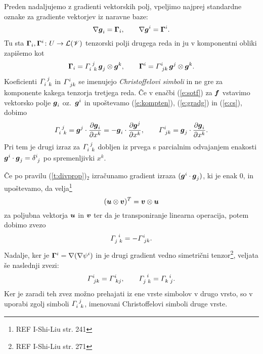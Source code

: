 Preden nadaljujemo z gradienti vektorskih polj, vpeljimo najprej standardne oznake
za gradiente vektorjev iz naravne baze:
\begin{equation} \label{e:gradg}
	\nabla\boldsymbol g_i=\mathbf \Gamma_i,\qquad\nabla\boldsymbol g^i=\mathbf \Gamma^i.
\end{equation}
Tu sta $\mathbf \Gamma_i,\mathbf \Gamma^i\colon U\to\mathcal L(\mathscr V)$ tenzorski polji drugega reda in ju
v komponentni obliki zapišemo kot
\begin{equation} \label{e:cs}
	\ten{\Gamma}_i=\cs{i}{j}{k}\,\vek{g}_j\otimes\vek{g}^k,\qquad\ten{\Gamma}^i=\ks{i}{jk}\,\vek{g}^j\otimes\vek{g}^k.
\end{equation}
Koeficienti $\cs{i}{j}{k}$ in $\ks{i}{jk}$ se imenujejo \emph{Christoffelovi simboli}
in ne gre za komponente kakega tenzorja tretjega reda. Če v enačbi (\ref{e:sotf})
za $\boldsymbol f$ vstavimo vektorsko polje $\boldsymbol g_i$ oz.~$\boldsymbol g^i$ in upoštevamo
(\ref{e:kompten}), (\ref{e:gradg}) in (\ref{e:cs}), dobimo
\begin{equation} \label{e:csexplicit}
	\cs{i}{j}{k}=\vek{g}^j\cdot\frac{\partial\vek{g}_i}{\partial x^k}
	=-\vek{g}_i\cdot\frac{\partial\vek{g}^j}{\partial x^k},\qquad
	\ks{i}{jk}=\vek{g}_j\cdot\frac{\partial\vek{g}_i}{\partial x^k}.
\end{equation}
Pri tem je drugi izraz za $\cs{i}{j}{k}$ dobljen iz prvega s parcialnim odvajanjem
enakosti $\vek{g}^i\cdot\vek{g}_j=\topbot{\delta}{i}{j}$ po spremenljivki $x^k$.

Če po pravilu (\ref{t:divprop})$_2$ izračunamo gradient izraza $(\boldsymbol g^i\cdot\boldsymbol g_j)$,
ki je enak 0, in upoštevamo, da velja\footnote{REF I-Shi-Liu str. 241}
\[(\boldsymbol u\otimes\boldsymbol v)^{T}=\boldsymbol v\otimes\boldsymbol u\]
za poljubna vektorja $\boldsymbol u$ in $\boldsymbol v$ ter da je transponiranje linearna operacija,
potem dobimo zvezo
\begin{equation} \label{e:lcs1}
	\cs{j}{i}{k}=-\ks{i}{jk}.
\end{equation}
Nadalje, ker je $\mathbf \Gamma^i=\nabla(\nabla\psi^i)$ in je drugi gradient vedno
simetrični tenzor\footnote{REF I-Shi-Liu str. 271}, veljata še naslednji zvezi:
\[ \ks{i}{jk}=\ks{i}{kj},\qquad\cs{j}{i}{k}=\cs{k}{i}{j}. \]
Ker je zaradi teh zvez možno prehajati iz ene vrste simbolov v drugo vrsto,
so v uporabi zgolj simboli $\cs{i}{j}{k}$, imenovani Christoffelovi simboli druge vrste.


